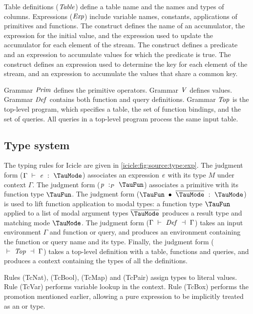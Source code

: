 Table definitions ($\mathit{Table}$) define a table name and the names and types of columns.
Expressions ($\mathit{Exp}$) include variable names, constants, applications of primitives and functions.
The \Ic@fold@ construct defines the name of an accumulator, the expression for the initial value, and the expression used to update the accumulator for each element of the stream.
The \Ic@filter@ construct defines a predicate and an expression to accumulate values for which the predicate is true.
The \Ic@group@ construct defines an expression used to determine the key for each element of the stream, and an expression to accumulate the values that share a common key.

Grammar $\mathit{Prim}$ defines the primitive operators.
Grammar $\mathit{V}$ defines values.
Grammar $\mathit{Def}$ contains both function and query definitions.
Grammar $\mathit{Top}$ is the top-level program, which specifies a table, the set of function bindings, and the set of queries.
All queries in a top-level program process the same input table.


\subsection{Type system}
\label{icicle:s:ElementsAndAggregates:TypeSystem}

The typing rules for Icicle are given in \cref{icicle:fig:source:type:exp}.
The judgment form ($\Typecheck{\Gamma}{\mi{e}}{\TauMode}$) associates an expression $\mathit{e}$ with its type $M$ under context $\Gamma$.
The judgment form ($\TypecheckP{\mi{p}}{\TauFun}$) associates a primitive with its function type $\TauFun$.
The judgment form ($\TypecheckApp{\TauFun}{\ov{\TauMode}}{\TauMode}$) is used to lift function application to modal types: a function type $\TauFun$ applied to a list of modal argument types $\ov{\TauMode}$ produces a result type and matching mode $\TauMode$.
The judgment form ($\TypecheckS{\Gamma}{\mi{Def}}{\Gamma}$) takes an input environment $\Gamma$ and function or query, and produces an environment containing the function or query name and its type.
Finally, the judgment form ($\TypecheckS{}{\mi{Top}}{\Gamma}$) takes a top-level definition with a table, functions and queries, and produces a context containing the types of all the definitions.




Rules (TcNat), (TcBool), (TcMap) and (TcPair) assign types to literal values.
Rule (TcVar) performs variable lookup in the context.
Rule (TcBox) performs the promotion mentioned earlier, allowing a pure expression to be implicitly treated as an \Ic@Element@ or \Ic@Aggregate@ type. 

